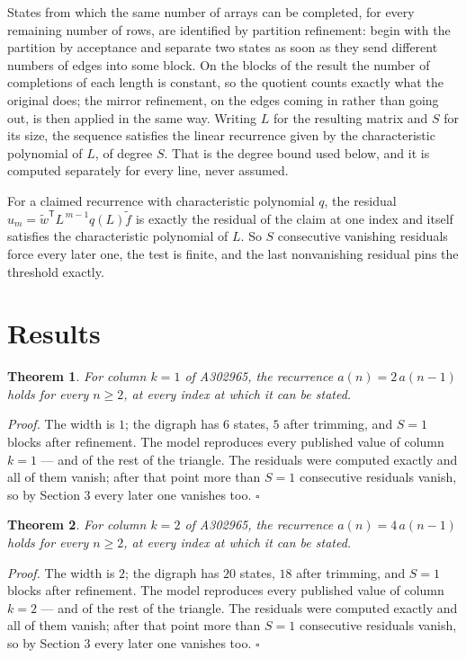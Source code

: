 \documentclass[11pt]{article}
\newtheorem{theorem}{Theorem}
\theoremstyle{definition}
\begin{document}
States from which the same number of arrays can be completed, for every remaining number of rows, are identified by partition refinement: begin with the partition by acceptance and separate two states as soon as they send different numbers of edges into some block. On the blocks of the result the number of completions of each length is constant, so the quotient counts exactly what the original does; the mirror refinement, on the edges coming in rather than going out, is then applied in the same way. Writing $L$ for the resulting matrix and $S$ for its size, the sequence satisfies the linear recurrence given by the characteristic polynomial of $L$, of degree $S$. That is the degree bound used below, and it is computed separately for every line, never assumed.

For a claimed recurrence with characteristic polynomial $q$, the residual $u_m = \tilde w^{\mathsf T}L^{\,m-1}q(L)\tilde f$ is exactly the residual of the claim at one index and itself satisfies the characteristic polynomial of $L$. So $S$ consecutive vanishing residuals force every later one, the test is finite, and the last nonvanishing residual pins the threshold exactly.

\section{Results}

\begin{theorem} For column $k = 1$ of A302965, the recurrence $a(n) = 2\,a(n-1)$ holds for every $n \ge 2$, at every index at which it can be stated.\end{theorem}

{\itshape Proof.} The width is $1$; the digraph has $6$ states, $5$ after trimming, and $S = 1$ blocks after refinement. The model reproduces every published value of column $k = 1$ --- and of the rest of the triangle. The residuals were computed exactly and all of them vanish; after that point more than $S = 1$ consecutive residuals vanish, so by Section 3 every later one vanishes too. $\square$

\begin{theorem} For column $k = 2$ of A302965, the recurrence $a(n) = 4\,a(n-1)$ holds for every $n \ge 2$, at every index at which it can be stated.\end{theorem}

{\itshape Proof.} The width is $2$; the digraph has $20$ states, $18$ after trimming, and $S = 1$ blocks after refinement. The model reproduces every published value of column $k = 2$ --- and of the rest of the triangle. The residuals were computed exactly and all of them vanish; after that point more than $S = 1$ consecutive residuals vanish, so by Section 3 every later one vanishes too. $\square$
\end{document}
